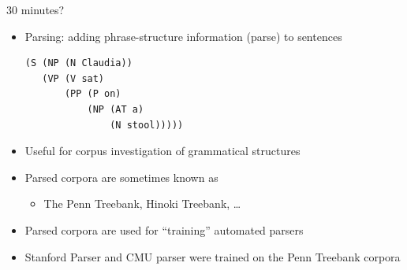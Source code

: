 \documentclass[a4paper,landscape,headrule,footrule,xetex]{foils}
\begin{document}
30 minutes?

\begin{itemize}\addtolength{\itemsep}{-1.5ex}
\item  Parsing: adding phrase-structure information (parse) to sentences
\begin{verbatim}
(S (NP (N Claudia))
   (VP (V sat)
       (PP (P on)
           (NP (AT a)
               (N stool)))))
\end{verbatim}

\item  Useful for corpus investigation of grammatical structures
\item  Parsed corpora are sometimes known as 
  \begin{itemize}
  \item The Penn Treebank, Hinoki Treebank, \ldots
  \end{itemize}
\item  Parsed corpora are used for ``training'' automated parsers
\item  Stanford Parser and CMU parser were trained on the Penn Treebank corpora
\end{itemize}
\end{document}
